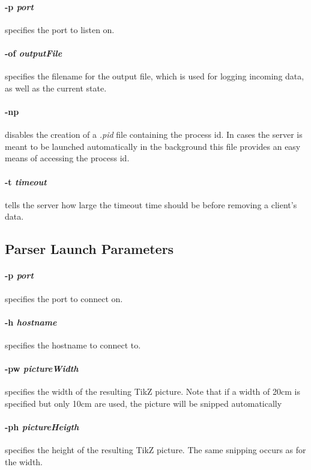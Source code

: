 \paragraph{-p \textit{port}} specifies the port to listen on.

\paragraph{-of \textit{outputFile}} specifies the filename for the output file, which is used for logging incoming data, as well as the current state.

\paragraph{-np} disables the creation of a \textit{.pid} file containing the process id.
In cases the server is meant to be launched automatically in the background this file provides an easy means of accessing the process id.

\paragraph{-t \textit{timeout}} tells the server how large the timeout time should be before removing a client's data.

\subsection*{Parser Launch Parameters}
\paragraph{-p \textit{port}} specifies the port to connect on.

\paragraph{-h \textit{hostname}} specifies the hostname to connect to.

\paragraph{-pw \textit{pictureWidth}} specifies the width of the resulting TikZ picture.
Note that if a width of 20cm is specified but only 10cm are used, the picture will be snipped automatically

\paragraph{-ph \textit{pictureHeigth}} specifies the height of the resulting TikZ picture.
The same snipping occurs as for the width.

